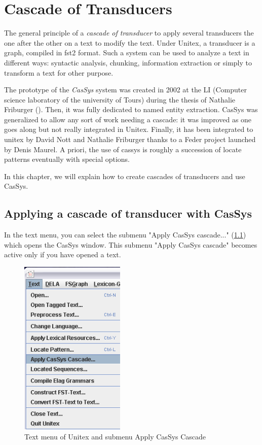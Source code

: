 \chapter{Cascade of Transducers}
\label{chap-cassys}

The general principle of a \textit{cascade of transducer}   to apply several transducers the one 
after the other on a text to modify the text. Under Unitex, a transducer is a graph, 
compiled in fst2 format. Such a system can be used to analyze a text in different ways: 
syntactic analysis, chunking, information extraction or simply to transform a text for other purpose.

\bigskip
\noindent The prototype of the \textit{CasSys}  system was created in 2002 at the LI 
(Computer science laboratory of the university of Tours) during the thesis of Nathalie Friburger (\cite{reco-np-friburger02}). 
Then, it was fully dedicated to named entity extraction. CasSys was generalized to allow any sort of work needing a cascade:
 it was improved as one goes along but not really integrated in Unitex. 
 Finally, it has been integrated to unitex by David Nott and Nathalie Friburger thanks to a Feder project launched by Denis Maurel.
A priori, the use of cassys is roughly a succession of locate patterns eventually with special options. 

\bigskip
\noindent In this chapter, we will explain how to create cascades of transducers and use CasSys.

\section{Applying a cascade of transducer with CasSys}
\label{section:applyCascade}

In the text menu, you can select the submenu "Apply CasSys cascade..." (\ref{fig13-01}) which opens the CasSys window.
This submenu "Apply CasSys cascade" becomes active only if you have opened a text.

\begin{figure}[!htb]
 \centering
 \includegraphics[width=5cm]{resources/img/fig13-01.png}
 \caption{Text menu of Unitex and submenu Apply CasSys Cascade}
 \label{fig13-01}
\end{figure}


